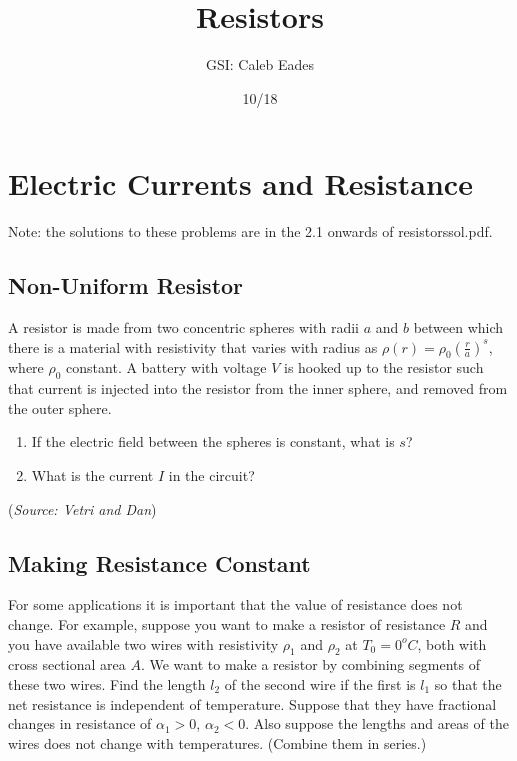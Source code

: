 \documentclass{article}
\begin{document}
\title{Resistors}
\author{GSI: Caleb Eades}
\date{10/18}
\maketitle

\section{Electric Currents and Resistance}

Note: the solutions to these problems are in the 2.1 onwards of resistorssol.pdf.

\subsection{Non-Uniform Resistor}

A resistor is made from two concentric spheres with radii $a$ and $b$ between which there is a material with resistivity that varies with radius as $\rho(r) = \rho_0 \left( \frac{r}{a} \right)^s$, where $\rho_0$ constant. A battery with voltage $V$ is hooked up to the resistor such that current is injected into the resistor from the inner sphere, and removed from the outer sphere.
\begin{enumerate}
	\item If the electric field between the spheres is constant, what is $s$?
	\item What is the current $I$ in the circuit?
\end{enumerate}

(\textit{Source: Vetri and Dan})

\subsection{Making Resistance Constant}

For some applications it is important that the value of resistance does not change. For example, suppose you want to make a resistor of resistance $R$ and you have available two wires with resistivity $\rho_1$ and $\rho_2$ at $T_0=0 ^o C$, both with cross sectional area $A$. We want to make a resistor by combining segments of these two wires. Find the length $l_2$ of the second wire if the first is $l_1$ so that the net resistance is independent of temperature. Suppose that they have fractional changes in resistance of $\alpha_1> 0$, $\alpha_2 < 0$. Also suppose the lengths and areas of the wires does not change with temperatures. (Combine them in series.)
 
\end{document}
